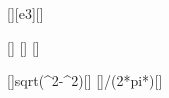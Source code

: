 [\kilo\hertz][e3][\hertz]

[\ohm]
[\hertz]
[\ohm]

[]{sqrt(\ZaX^2-\RX^2)}[\ohm]
[]{\XLX/(2*pi*\faX)}[\henry]
